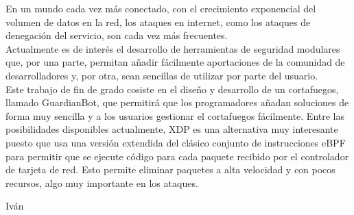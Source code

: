 En un mundo cada vez más conectado, con el crecimiento exponencial del volumen de datos en la red, los ataques en internet, como los ataques de denegación del servicio, son cada vez más frecuentes.
\\Actualmente es de interés el desarrollo de herramientas de seguridad modulares que, por una parte, permitan añadir fácilmente aportaciones de la comunidad de desarrolladores y, por otra, sean sencillas de utilizar por parte del usuario.
\\Este trabajo de fin de grado cosiste en el diseño y desarrollo de un cortafuegos, llamado GuardianBot, que permitirá que los programadores añadan soluciones de forma muy sencilla y a los usuarios gestionar el cortafuegos fácilmente. Entre las posibilidades disponibles actualmente, XDP es una alternativa muy interesante puesto que usa una versión extendida del clásico conjunto de instrucciones eBPF para permitir que se ejecute código para cada paquete recibido por el controlador de tarjeta de red. Esto permite eliminar paquetes a alta velocidad y con pocos recursos, algo muy importante en los ataques.

\hfill \begin{flushright}Iván\end{flushright}\hfill
